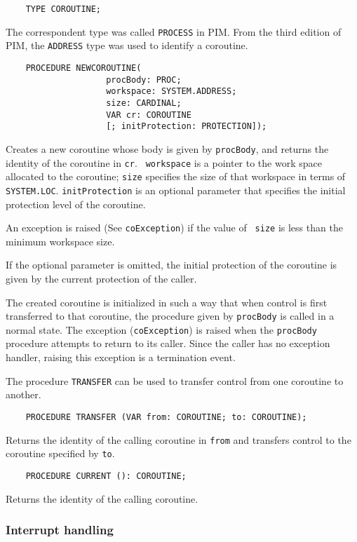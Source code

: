 \verb'    TYPE COROUTINE;'

The correspondent type was called {\tt PROCESS} in PIM.
From the third edition of PIM, the {\tt ADDRESS} type was used
to identify a coroutine.

\begin{verbatim}
    PROCEDURE NEWCOROUTINE(
                    procBody: PROC;
                    workspace: SYSTEM.ADDRESS;
                    size: CARDINAL;
                    VAR cr: COROUTINE
                    [; initProtection: PROTECTION]);
\end{verbatim}
Creates a new coroutine whose body is given by {\tt procBody}, and
returns the identity of the coroutine in {\tt cr}. {\tt
workspace} is a pointer to the work space allocated to the
coroutine; {\tt size} specifies the size of that workspace in
terms of \verb'SYSTEM.LOC'. {\tt initProtection} is an optional
parameter that specifies the initial protection level of the
coroutine.

An exception is raised (See {\tt coException}) if the value of {\tt
size} is less than the minimum workspace size.

If the optional parameter is omitted, the initial protection of
the coroutine is given by the current protection of the caller.

The created coroutine is initialized in such a way that when
control is first transferred to that coroutine, the procedure
given by {\tt procBody} is called in a normal state. The exception
({\tt coException})  is raised when the {\tt procBody} procedure
attempts to return to its caller. Since the caller has no
exception handler, raising this exception is a termination
event.

The procedure {\tt TRANSFER} can be used to transfer control
from one coroutine to another.

\verb'    PROCEDURE TRANSFER (VAR from: COROUTINE; to: COROUTINE);'

Returns the identity of the calling coroutine in {\tt from} and
transfers control to the coroutine specified by {\tt to}.

\verb'    PROCEDURE CURRENT (): COROUTINE;'

Returns the identity of the calling coroutine.

\subsubsection{Interrupt handling}

